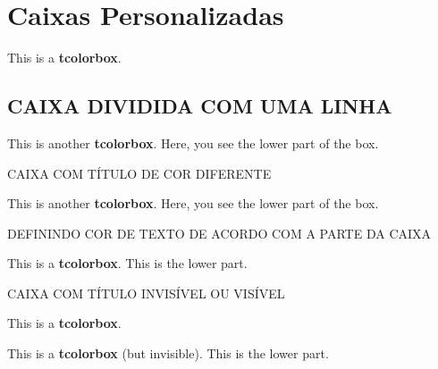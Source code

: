 \cleardoublepage\documentclass[../main.tex]{subfiles}
\begin{document}

\chapter{Caixas Personalizadas}
\begin{tcolorbox} %
This is a \textbf{tcolorbox}.
\end{tcolorbox}\vspace{1CM}


\section{CAIXA DIVIDIDA COM UMA LINHA}
\begin{tcolorbox}
This is another \textbf{tcolorbox}.
\tcblower
Here, you see the lower part of the box.
\end{tcolorbox}\vspace{1cm}


CAIXA COM TÍTULO DE COR DIFERENTE\\
\begin{tcolorbox}[colback=red!5!white,colframe=red!95!black,fonttitle=\bfseries,title=TITULO]
This is another \textbf{tcolorbox}.
\tcblower
Here, you see the lower part of the box.
\end{tcolorbox}\vspace{1CM}

DEFININDO COR DE TEXTO DE ACORDO COM A PARTE DA CAIXA
\begin{tcolorbox}[colupper=red!75!black] %
This is a \textbf{tcolorbox}.
\tcblower
This is the lower part.
\end{tcolorbox}

CAIXA COM TÍTULO INVISÍVEL OU VISÍVEL
\begin{tcolorbox}[title=TITULO VISÍVEL OU INVISISIVEL,
titlebox=invisible,colback=red!5!white,coltitle=white]
This is a \textbf{tcolorbox}.
\end{tcolorbox}

\begin{tcolorbox}[upperbox=invisible,colback=white,lowerbox=visible]%
This is a \textbf{tcolorbox} (but invisible).
\tcblower
This is the lower part.
\end{tcolorbox}\vspace{1CM}
\end{document}
